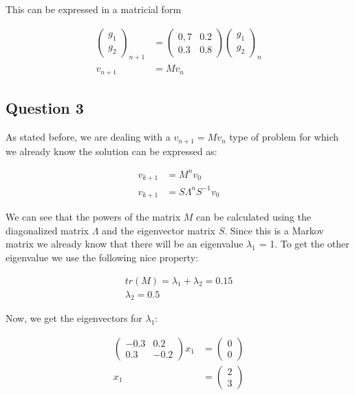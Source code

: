\documentclass{article}
\begin{document}
This can be expressed in a matricial form

\begin{equation}
\begin{aligned}
\left(
\begin{array}{c}
g_1\\ 
g_2
\end{array}
\right)_{n+1} 
&=
\begin{pmatrix}
 0,7 & 0.2\\
 0.3 & 0.8
 \end{pmatrix}
\left(
\begin{array}{c}
g_1\\ 
g_2
\end{array}
\right)_n \\
v_{n+1} &= M v_n
\label{eq:mm1}
\end{aligned}
\end{equation} 

\subsection{Question 3}

As stated before, we are dealing with a $v_{n+1} = Mv_n$ 
type of problem for which we already know the solution
can be expressed as:

\begin{equation*}
\begin{aligned}
v_{k+1} &= M^n v_0 \\
v_{k+1} &= S \Lambda^n S^{-1} v_0
\end{aligned}
\end{equation*} 

We can see that the powers of the matrix $M$ can be calculated using the 
diagonalized matrix $\Lambda$ and the eigenvector matrix $S$.
Since this is a Markov matrix we already know that there will be an eigenvalue
$\lambda_1$ = 1. To get the other eigenvalue we use the following nice property:

\begin{equation*}
\begin{aligned}
tr(M) = \lambda_1 + \lambda_2 = 0.15\\ 
\lambda_2 = 0.5
\end{aligned}
\end{equation*} 

Now, we get the eigenvectors for $\lambda_1$:

\begin{equation}
\begin{aligned}
\begin{pmatrix}
 -0.3 & 0.2\\
 0.3 & -0.2
 \end{pmatrix}
x_1
&=
\left(
\begin{array}{c}
0\\ 
0
 \end{array}
 \right) \\
x_1 &= 
\left(
\begin{array}{c}
2\\ 
3 
 \end{array}
 \right) 
\label{eq:mm1}
\end{aligned}
\end{equation} 
\end{document}
